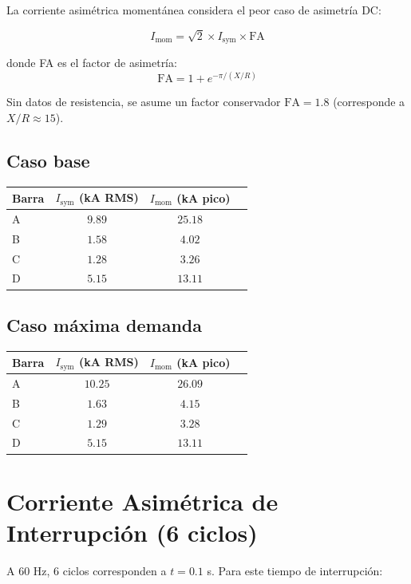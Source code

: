 \documentclass[12pt,a4paper]{article}
\begin{document}
La corriente asimétrica momentánea considera el peor caso de asimetría DC:

\[
I_{\text{mom}} = \sqrt{2} \times I_{\text{sym}} \times \text{FA}
\]

donde FA es el factor de asimetría:
\[
\text{FA} = 1 + e^{-\pi/(X/R)}
\]

Sin datos de resistencia, se asume un factor conservador $\text{FA} = 1.8$ (corresponde a $X/R \approx 15$).

\subsection{Caso base}

\begin{center}
\begin{tabular}{lccc}
\toprule
Barra & $I_{\text{sym}}$ (kA RMS) & $I_{\text{mom}}$ (kA pico) \\
\midrule
A & $9.89$ & $25.18$ \\
B & $1.58$ & $4.02$ \\
C & $1.28$ & $3.26$ \\
D & $5.15$ & $13.11$ \\
\bottomrule
\end{tabular}
\end{center}

\subsection{Caso máxima demanda}

\begin{center}
\begin{tabular}{lccc}
\toprule
Barra & $I_{\text{sym}}$ (kA RMS) & $I_{\text{mom}}$ (kA pico) \\
\midrule
A & $10.25$ & $26.09$ \\
B & $1.63$ & $4.15$ \\
C & $1.29$ & $3.28$ \\
D & $5.15$ & $13.11$ \\
\bottomrule
\end{tabular}
\end{center}

\section{Corriente Asimétrica de Interrupción (6 ciclos)}

A 60 Hz, 6 ciclos corresponden a $t = 0.1$ s. Para este tiempo de interrupción:
\end{document}

